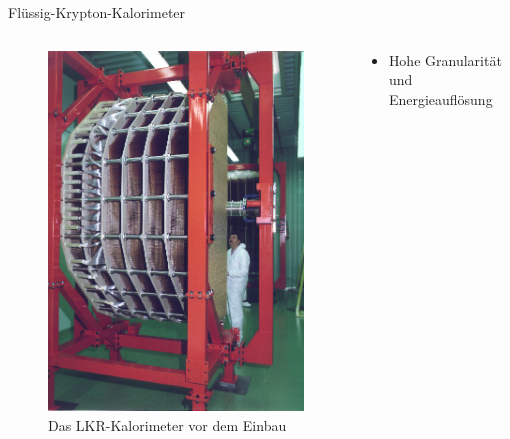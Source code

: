 \documentclass[aspectratio=1610, professionalfonts, 9pt, t]{beamer}
\begin{document}
  \begin{frame}{Flüssig-Krypton-Kalorimeter}
    \begin{columns}[onlytextwidth]
      \begin{column}{0.4\textwidth}
        \begin{figure}[ht]
          \begin{center}
            \includegraphics[height=0.7\textheight]{Images/na48lkr.png} %
            \caption{Das LKR-Kalorimeter vor dem Einbau}
          \end{center}
        \end{figure}
      \end{column}
      \begin{column}{0.5\textwidth}
        \begin{itemize}
          \item Hohe Granularität und Energieauflösung

\end{itemize}
\end{column}
\end{columns}
\end{frame}
\end{document}
